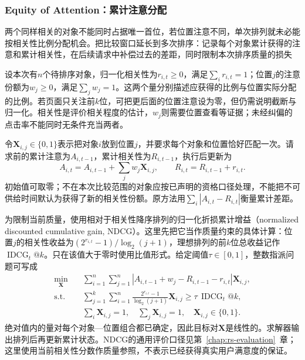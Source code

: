 \subsubsection{Equity of Attention：累计注意分配}
\label{sec:rs-equity-attention}

两个同样相关的对象不能同时占据唯一首位，若位置注意不同，单次排列就未必能按相关性比例分配机会。把比较窗口延长到多次排序：记录每个对象累计获得的注意和累计相关性，在后续请求中补偿过去的差距，同时限制本次排序质量的损失

设本次有$n$个待排序对象，归一化相关性为$r_{i,t}\geq0$，满足$\sum_i r_{i,t}=1$；位置$j$的注意份额为$w_j\geq0$，满足$\sum_j w_j=1$。这两个量分别描述应获得的比例与位置实际分配的比例。若页面只关注前$k$位，可把更后面的位置注意设为零，但仍需说明截断与归一化。相关性是评价相关程度的估计，$w_j$则需要位置查看等证据；未经纠偏的点击率不能同时无条件充当两者。

令$\bm{X}_{i,j}\in\{0,1\}$表示把对象$i$放到位置$j$，并要求每个对象和位置恰好匹配一次。请求前的累计注意为$A_{i,t-1}$，累计相关性为$R_{i,t-1}$，执行后更新为
\[
 A_{i,t}=A_{i,t-1}+\sum_jw_j\bm{X}_{i,j},
 \qquad
 R_{i,t}=R_{i,t-1}+r_{i,t}.
\]
初始值可取零；不在本次比较范围的对象应按已声明的资格口径处理，不能把不可供给时间默认为获得了新的相关性份额。原方法用$\sum_i|A_{i,t}-R_{i,t}|$衡量累计差距。

为限制当前质量，使用相对于相关性降序排列的归一化折损累计增益（normalized discounted cumulative gain, NDCG）。这里先把它当作质量约束的具体计算：位置$j$的相关性收益为$(2^{r_{i,t}}-1)/\log_2(j+1)$，理想排列的前$k$位总收益记作$\operatorname{IDCG}_t@k$。只在该值大于零时使用比值形式。给定阈值$\tau\in[0,1]$，整数指派问题可写成
\begin{equation}
 \begin{aligned}
  \min_{\bm{X}}\quad&
    \sum_{i=1}^{n}\sum_{j=1}^{n}
       \left|A_{i,t-1}+w_j-R_{i,t-1}-r_{i,t}\right|
       \bm{X}_{i,j},\\
  \text{s.t.}\quad&
    \sum_{j=1}^{k}\sum_{i=1}^{n}
       \frac{2^{r_{i,t}}-1}{\log_2(j+1)}\bm{X}_{i,j}
       \geq\tau\,\operatorname{IDCG}_t@k,\\
  &\sum_i\bm{X}_{i,j}=1,\quad
   \sum_j\bm{X}_{i,j}=1,\quad
   \bm{X}_{i,j}\in\{0,1\}.
 \end{aligned}
 \label{eq:rs-equity-assignment}
\end{equation}
绝对值内的量对每个对象—位置组合都已确定，因此目标对$\bm{X}$是线性的。求解器输出排列后再更新累计状态。NDCG的通用评价口径见第~\ref{chap:rs-evaluation}~章；这里使用当前相关性分数作质量参照，不表示已经获得真实用户满意度的保证。

